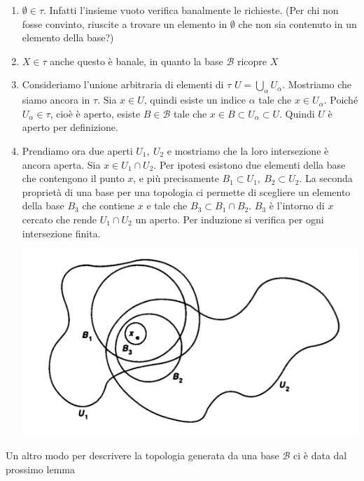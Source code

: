 \documentclass[10pt,a4paper]{article}
\theoremstyle{definition}
\theoremstyle{plain}
\theoremstyle{remark}
\theoremstyle{remark}
\newcommand{\B}{\mathcal{B}}
\begin{document}
\begin{enumerate}
\item $\emptyset \in \tau$. Infatti l'insieme vuoto verifica banalmente le richieste. (Per chi non fosse convinto, riuscite a trovare un elemento in $\emptyset$ che non sia contenuto in un elemento della base?)
\item $X \in \tau$ anche questo è banale, in quanto la base $\B$ ricopre $X$
\item Consideriamo l'unione arbitraria di elementi di $\tau$ $U= \bigcup_{\alpha}U_{\alpha}$. Mostriamo che siamo ancora in $\tau$. Sia $x \in U$, quindi esiste un indice $\alpha$ tale che $x \in U_{\alpha}$. Poiché $U_{\alpha} \in \tau$, cioè è aperto, esiste $B \in \B$ tale che $x \in B \subset U_{\alpha} \subset U$. Quindi $U$ è aperto per definizione.
\item Prendiamo ora due aperti $U_1, \ U_2$ e mostriamo che la loro intersezione è ancora aperta. Sia $x \in U_1 \cap U_2$. Per ipotesi esistono  due elementi della base che contengono il punto $x$, e più precisamente $B_1 \subset U_1, \ B_2 \subset U_2$. La seconda proprietà di una base per una topologia ci permette di scegliere un elemento della base $B_3$ che contiene $x$ e tale che $B_3 \subset B_1 \cap B_2$. $B_3$ è l'intorno di $x$ cercato che rende $U_1 \cap U_2$ un aperto.  Per induzione si verifica per ogni intersezione finita. 



\begin{center}
\includegraphics[scale=0.5]{intbase.png} 
\end{center}

\end{enumerate}



Un altro modo  per descrivere la topologia generata da una base $\B$ ci è data dal prossimo lemma
\end{document}
